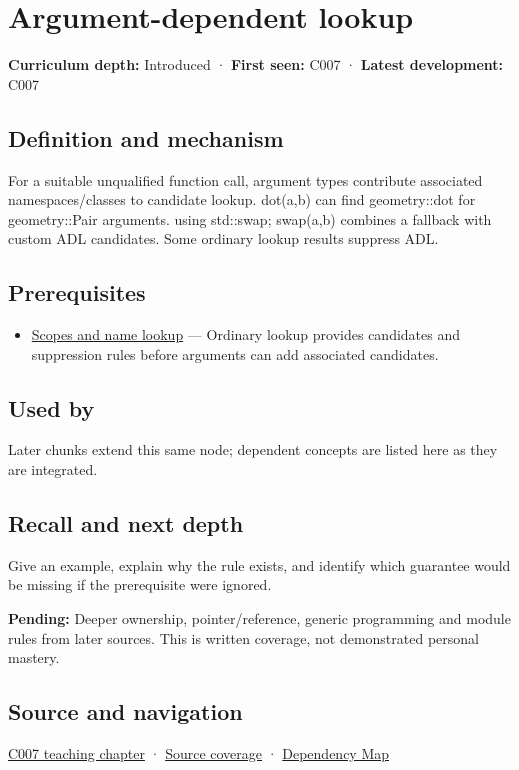 \hypertarget{appendix-7863714aa97f}{}\label{referencestart:appendix-7863714aa97f}
\section{Argument-dependent lookup}\label{appendix-7863714aa97f-argument-dependent-lookup}

\textbf{Curriculum depth:} Introduced · \textbf{First seen:} C007 · \textbf{Latest development:} C007

\subsection{Definition and mechanism}\label{appendix-7863714aa97f-definition-and-mechanism}

For a suitable unqualified function call, argument types contribute associated namespaces/classes to candidate lookup. dot(a,b) can find geometry::dot for geometry::Pair arguments. using std::swap; swap(a,b) combines a fallback with custom ADL candidates. Some ordinary lookup results suppress ADL.

\subsection{Prerequisites}\label{appendix-7863714aa97f-prerequisites}

\begin{itemize}
\tightlist
\item
  \hyperref[appendix-b12b31759da1]{Scopes and name lookup} --- Ordinary lookup provides candidates and suppression rules before arguments can add associated candidates.
\end{itemize}

\subsection{Used by}\label{appendix-7863714aa97f-used-by}

Later chunks extend this same node; dependent concepts are listed here as they are integrated.

\subsection{Recall and next depth}\label{appendix-7863714aa97f-recall-and-next-depth}

Give an example, explain why the rule exists, and identify which guarantee would be missing if the prerequisite were ignored.

\textbf{Pending:} Deeper ownership, pointer/reference, generic programming and module rules from later sources. This is written coverage, not demonstrated personal mastery.

\subsection{Source and navigation}\label{appendix-7863714aa97f-source-and-navigation}

\hyperref[01-foundations-i-ch002-a-spelling-needs-a-place-and-a-meaning]{C007 teaching chapter} · \hyperref[appendix-fd090d982a15-m007---parts-101-112]{Source coverage} · \hyperref[appendix-4ad47bdd269a]{Dependency Map}
